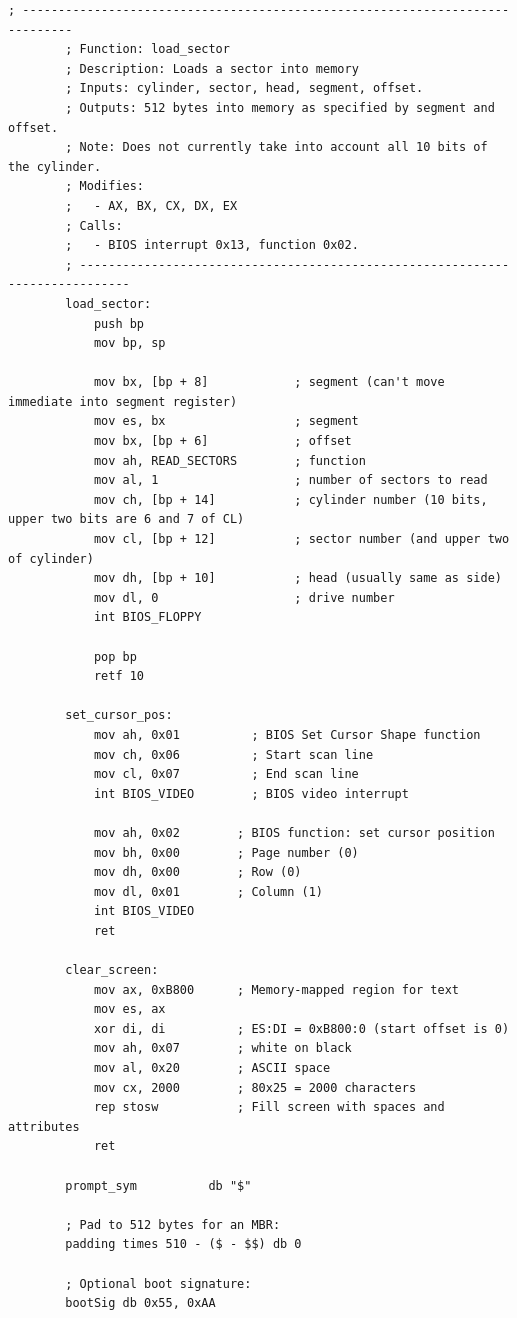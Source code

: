 \documentclass{article}
\begin{document}
\begin{lstlisting}[caption={os623V04.asm listing}, captionpos=t]
        ; -----------------------------------------------------------------------------
        ; Function: load_sector
        ; Description: Loads a sector into memory
        ; Inputs: cylinder, sector, head, segment, offset.
        ; Outputs: 512 bytes into memory as specified by segment and offset.
        ; Note: Does not currently take into account all 10 bits of the cylinder.
        ; Modifies:
        ;   - AX, BX, CX, DX, EX
        ; Calls:
        ;   - BIOS interrupt 0x13, function 0x02.
        ; -----------------------------------------------------------------------------
        load_sector:
            push bp
            mov bp, sp

            mov bx, [bp + 8]            ; segment (can't move immediate into segment register)
            mov es, bx                  ; segment
            mov bx, [bp + 6]            ; offset
            mov ah, READ_SECTORS        ; function
            mov al, 1                   ; number of sectors to read
            mov ch, [bp + 14]           ; cylinder number (10 bits, upper two bits are 6 and 7 of CL)
            mov cl, [bp + 12]           ; sector number (and upper two of cylinder)
            mov dh, [bp + 10]           ; head (usually same as side)
            mov dl, 0                   ; drive number
            int BIOS_FLOPPY

            pop bp
            retf 10

        set_cursor_pos:
            mov ah, 0x01          ; BIOS Set Cursor Shape function
            mov ch, 0x06          ; Start scan line
            mov cl, 0x07          ; End scan line
            int BIOS_VIDEO        ; BIOS video interrupt

            mov ah, 0x02        ; BIOS function: set cursor position
            mov bh, 0x00        ; Page number (0)
            mov dh, 0x00        ; Row (0)
            mov dl, 0x01        ; Column (1)
            int BIOS_VIDEO
            ret

        clear_screen:
            mov ax, 0xB800      ; Memory-mapped region for text
            mov es, ax
            xor di, di          ; ES:DI = 0xB800:0 (start offset is 0)
            mov ah, 0x07        ; white on black
            mov al, 0x20        ; ASCII space
            mov cx, 2000        ; 80x25 = 2000 characters
            rep stosw           ; Fill screen with spaces and attributes
            ret

        prompt_sym          db "$"

        ; Pad to 512 bytes for an MBR:
        padding times 510 - ($ - $$) db 0

        ; Optional boot signature:
        bootSig db 0x55, 0xAA
    \end{lstlisting}
\end{document}
